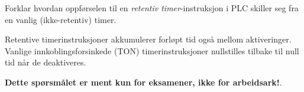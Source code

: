 

Forklar hvordan oppførselen til en {\it retentiv timer}-instruksjon i PLC skiller seg fra en vanlig (ikke-retentiv) timer.







Retentive timerinstruksjoner akkumulerer forløpt tid også mellom aktiveringer. Vanlige innkoblingsforsinkede (TON) timerinstruksjoner nullstilles tilbake til null tid når de deaktiveres.







{\bf Dette spørsmålet er ment kun for eksamener, ikke for arbeidsark!}.


